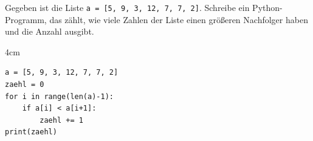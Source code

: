 \question[4]
Gegeben ist die Liste \texttt{a = [5, 9, 3, 12, 7, 7, 2]}. Schreibe ein Python-Programm, 
das zählt, wie viele Zahlen der Liste einen größeren Nachfolger haben
und die Anzahl ausgibt.

\begin{solutionbox}{4cm}
\begin{lstlisting}
a = [5, 9, 3, 12, 7, 7, 2]
zaehl = 0
for i in range(len(a)-1):
    if a[i] < a[i+1]:
        zaehl += 1
print(zaehl)
\end{lstlisting}
\end{solutionbox}